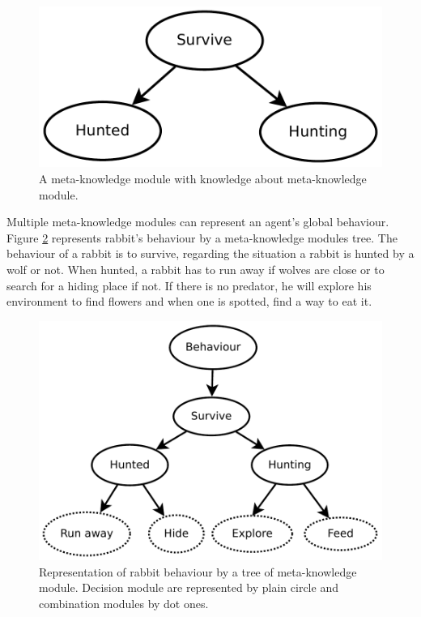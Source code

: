 \documentclass{aamas2012}
\begin{document}
	\begin{figure}
		\centering
		\includegraphics[keepaspectratio=true, scale=0.4]{survive.pdf}
		\caption
		{
			\label{survive_figure}
			A meta-knowledge module with knowledge about meta-knowledge module.
		}
	\end{figure}
	
	Multiple meta-knowledge modules can represent an agent's global behaviour.
	Figure \ref{behaviour_tree} represents rabbit's behaviour by a meta-knowledge modules tree.
	The behaviour of a rabbit is to survive, regarding the situation a rabbit is hunted by a wolf or not.
	When hunted, a rabbit has to run away if wolves are close or to search for a hiding place if not.
	If there is no predator, he will explore his environment to find flowers and when one is spotted, find a way to eat it.
	
	\begin{figure}
		\centering
		\includegraphics[keepaspectratio=true, scale=0.5]{behaviour_tree.pdf}
		\caption
		{
			\label{behaviour_tree}
			Representation of rabbit behaviour by a tree of meta-knowledge module.
			Decision module are represented by plain circle and combination modules by dot ones.
		}
	\end{figure}
	
\end{document}
